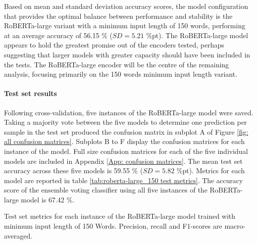 \documentclass[12pt]{report}
\begin{document}
Based on mean and standard deviation accuracy scores, the model configuration that provides the optimal balance between performance and stability is the RoBERTa-large variant with a minimum input length of 150 words, performing at an average accuracy of 56.15 \% ($SD=5.21$ \%pt).
The RoBERTa-large model appears to hold the greatest promise out of the encoders tested, perhaps suggesting that larger models with greater capacity should have been included in the tests.
The RoBERTa-large encoder will be the centre of the remaining analysis, focusing primarily on the 150 words minimum input length variant.

\paragraph*{Test set results}
Following cross-validation, five instances of the RoBERTa-large model were saved.
Taking a majority vote between the five models to determine one prediction per sample in the test set produced the confusion matrix in subplot A of Figure \ref{fig: all confusion matrices}.
Subplots B to F display the confusion matrices for each instance of the model.
Full size confusion matrices for each of the five individual models are included in Appendix \ref{App: confusion matrices}.
The mean test set accuracy across these five models is 59.55 \% ($SD=5.82$ \%pt).
Metrics for each model are reported in table \ref{tab:roberta-large_150 test metrics}.
The accuracy score of the ensemble voting classifier using all five instances of the RoBERTa-large model is 67.42 \%.

\begin{table}
    \begin{adjustbox}{width=1\textwidth}
        
    \end{adjustbox}
    \caption{Test set metrics for each instance of the RoBERTa-large model trained with minimum input length of 150 Words. Precision, recall and F1-scores are macro-averaged.}
    \label{tab:roberta-large_150 test metrics}
\end{table}
\end{document}
